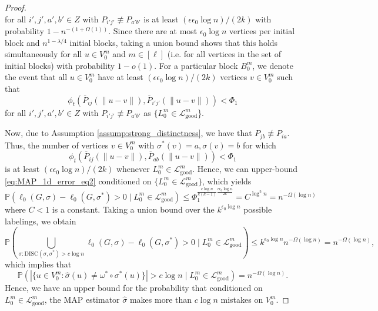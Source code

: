\documentclass{article}
\renewcommand{\P}{\mathbb{P}}
\newcommand{\1}{\mathbbm{1}}
\newcommand{\calL}{\mathcal{L}}
\theoremstyle{definition}
\theoremstyle{plain}
\begin{document}
\begin{proof}
\begin{equation*}
    \end{equation*}
    for all $i',j',a',b' \in Z$ with $P_{i'j'} \not \equiv P_{a'b'}$ is at least $(\epsilon \epsilon_0 \log n) / (2k)$ with probability $1 - n^{-(1 + \Omega(1))}$. Since there are at most $\epsilon_0 \log n$ vertices per initial block and $n^{1 - \lambda/4}$ initial blocks, taking a union bound shows that this holds simultaneously for all $u \in V_0^m$ and $m \in [\ell]$ (i.e. for all vertices in the set of initial blocks) with probability $1 - o(1)$. For a particular block $B_0^m$, we denote the event that all $u \in V_0^m$ have at least $(\epsilon \epsilon_0 \log n)/(2k)$ vertices $v \in V_0^m$ such that
    \begin{equation*}
        \phi_t(\overline{P}_{ij}(\|u-v\|), \overline{P}_{i'j'}(\|u-v\|)) < \Phi_1 
    \end{equation*}
    for all $i',j',a',b' \in Z$ with $P_{i'j'} \not \equiv P_{a'b'}$ as $\{L_0^m \in \calL_\text{good}^m$\}.
    
    Now, due to Assumption \ref{assump:strong_distinctness}, we have that $P_{jb} \not \equiv P_{ia}$. Thus, the number of vertices $v \in V_0^m$ with $\sigma^*(v) = a, \sigma(v) = b$ for which 
    \begin{equation*}
        \phi_t(\overline{P}_{ij}(\|u-v\|), \overline{P}_{ab}(\|u-v\|)) < \Phi_1
    \end{equation*}
    is at least $(\epsilon \epsilon_0 \log n)/(2k)$ whenever $L_0^m \in \calL_\text{good}^m$. Hence, we can upper-bound \eqref{eq:MAP_1d_error_eq2} conditioned on $\{L_0^m \in \calL_\text{good}^m\}$, which yields
    \begin{equation*}
        \P(\ell_0(G, \sigma) - \ell_0(G, \sigma^*) > 0 \mid L_0^m \in \calL_\text{good}^m ) \leq \Phi_1^{\frac{c \log n}{k(k-1)} \frac{\epsilon \epsilon_0 \log n}{2k}} = C^{\log^2 n} = n^{-\Omega(\log n)}
    \end{equation*}
    where $C < 1$ is a constant. Taking a union bound over the $k^{\epsilon_0 \log n}$ possible labelings, we obtain
    \begin{equation*}
        \P(\bigcup_{\sigma: \text{DISC}(\sigma, \sigma^*) > c \log n}\ell_0(G, \sigma) - \ell_0(G, \sigma^*) > 0 \mid L_0^m \in \calL_\text{good}^m ) \leq k^{\epsilon_0 \log n} n^{-\Omega(\log n)} = n^{-\Omega(\log n)},
    \end{equation*}
    which implies that
    \begin{equation*}
        \P( |\{u \in V_0^m: \hat{\sigma}(u) \neq \omega^* \circ \sigma^*(u)\}| > c \log n \mid L_0^m \in \calL_\text{good}^m) = n^{-\Omega(\log n)}.
    \end{equation*}
    Hence, we have an upper bound for the probability that conditioned on $L_0^m \in \calL_\text{good}^m$, the MAP estimator $\hat{\sigma}$ makes more than  $c \log n$ mistakes on $V_0^m$. 
    

\end{proof}
\end{document}
